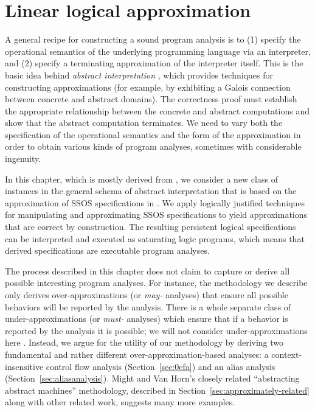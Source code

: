 \chapter{Linear logical approximation}
\label{chapter-approx}

A general recipe for constructing a sound program analysis is to (1)
specify the operational semantics of the underlying programming
language via an interpreter, and (2) specify a terminating
approximation of the interpreter itself. This is the basic idea behind
{\it abstract interpretation} \cite{cousot77abstract}, which provides
techniques for constructing approximations (for example, by exhibiting
a Galois connection between concrete and abstract domains). The
correctness proof must establish the appropriate relationship between
the concrete and abstract computations and show that the abstract
computation terminates. We need to vary both the specification of the
operational semantics and the form of the approximation in order to
obtain various kinds of program analyses, sometimes with considerable
ingenuity.

In this chapter, which is mostly derived from \cite{simmons11logical},
we consider a new class of instances in the general schema of abstract
interpretation that is based on the approximation of SSOS
specifications in \sls. We apply logically justified techniques for
manipulating and approximating SSOS specifications to yield
approximations that are correct by construction. The resulting
persistent logical specifications can be interpreted and executed as
saturating logic programs, which means that derived specifications
are executable program analyses.

The process described in this chapter does not claim to capture or 
derive all possible interesting program analyses. For
instance, the methodology we describe only derives over-approximations
(or {\it may-} analyses) that ensure all possible behaviors will be
reported by the analysis. There is a whole separate class of 
under-approximations (or {\it must-} analyses) which ensure that if a
behavior is reported by the analysis it is possible; %
we will not consider under-approximations here
\cite{godefroid10compositional}. Instead, we argue for the utility of
our methodology by deriving two fundamental and rather different
over-approximation-based analyses: a context-insensitive control flow
analysis (Section~\ref{sec:0cfa}) and an alias analysis
(Section~\ref{sec:aliasanalysis}). Might and Van Horn's closely
related ``abstracting abstract machines'' methodology, described in
Section~\ref{sec:approximately-related} along with other related work,
suggests many more examples.

